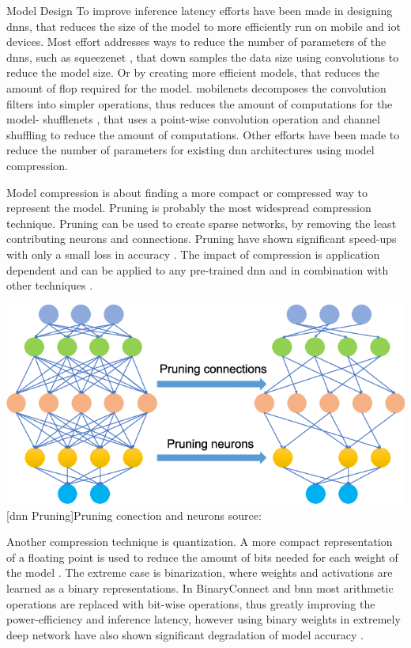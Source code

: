 \begin{enumdescript}
	\item[Model Design] To improve inference latency efforts have been made in designing \gls{dnn}s, that reduces the size of the model to more efficiently run on mobile and \gls{iot} devices. Most effort addresses  ways to reduce the number of parameters of the \gls{dnn}s, such as \gls{squeezenet} \cite{iandola_squeezenet:_2016}, that down samples the data size using convolutions to reduce the model size. Or by creating more efficient models, that reduces the amount of \gls{flop} required for the model. \gls{mobilenet}s \cite{howard_mobilenets:_2017,sandler_mobilenetv2:_2018} decomposes the convolution filters into simpler operations, thus reduces the amount of computations for the model- \gls{shufflenet}s \cite{zhang_shufflenet:_2017, ma_shufflenet_2018}, that uses a point-wise convolution operation and channel shuffling to reduce the amount of computations. Other efforts have been made to reduce the number of parameters for existing \gls{dnn} architectures using model compression.
	
	\item[Model compression]  is about finding a more compact or compressed way to represent the model. Pruning is probably the most widespread compression technique. Pruning can be used to create sparse networks, by removing the least contributing neurons and connections. Pruning have shown significant speed-ups with only a small loss in accuracy \cite{zhou_edge_2019}. The impact of compression is application dependent and can be applied to any pre-trained \gls{dnn} and in combination with other techniques \cite{cheng_survey_2017}.
	
	\begin{minipage}[t]{\linewidth}
		\centering
		\includegraphics[width=.4\linewidth]{figures/articles/Pruning-a-neural-network}
		[\gls{dnn} Pruning]{Pruning conection and neurons source:  \cite{chen_deep_2019}}
	\end{minipage}
	
	Another compression technique is quantization. A more compact representation of a floating point is used to reduce the amount of bits needed for each weight of the model \cite{cheng_survey_2017}. The extreme case is binarization, where weights and activations are learned as a binary representations. In BinaryConnect \cite{courbariaux_binaryconnect:_2015} and \gls{bnn} \cite{courbariaux_binarized_2016} most arithmetic operations are replaced with bit-wise operations, thus greatly improving the power-efficiency and inference latency, however using binary weights in extremely deep network have also shown significant degradation of model accuracy \cite{cheng_survey_2017}.
	

\end{enumdescript}

